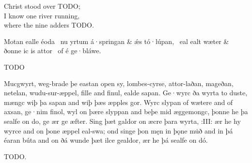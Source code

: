 \bvb Christ stood over TODO; \\
I know one river running, \\
where the nine adders TODO.\evb\evg


\bvg\bva Motan ealle éoda \hld\ nu yrtum á·springan &
ǽs tó·lúpan, \hld\ eal ealt wæter &
ðonne ic is attor \hld\ of é ge·bláwe.\eva

\bvb TODO\evb\evg


\bpg\bpa Mucgwyrt, weg-brade þe eastan open sy, lombes-cyrse, attor-laðan, mageðan, netelan, wudu-sur-æppel, fille and finul, ealde sapan. Ge·wyrc ða wyrta to duste, mængc wiþ þa sapan and wiþ þæs æpples gor. Wyrc slypan of wætere and of axsan, ge·nim finol, wyl on þære slyppan and beþe mid æggemongc, þonne he þa sealfe on do, ge ær ge æfter. Sing þæt galdor on æcre þara wyrta, :III: ær he hy wyrce and on þone æppel eal-swa; ond singe þon męn in þǫne mu̇ð and in þá éaran búta and on ðá wunde þæt ilce gealdor, ær he þá sealfe on dó.\epa

\bpb TODO.\epb\epg

\sectionline
